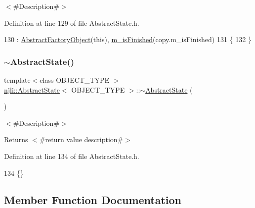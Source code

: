$<$\#\+Description\#$>$ 

Definition at line 129 of file Abstract\+State.\+h.


\begin{DoxyCode}
130       : \mbox{\hyperlink{classnjli_1_1_abstract_factory_object_a4f7ae7bf09c7c9426e7d6023f7fd8dec}{AbstractFactoryObject}}(\textcolor{keyword}{this}), \mbox{\hyperlink{classnjli_1_1_abstract_state_a445a5d1ac7572b8b01b81937c89e960c}{m\_isFinished}}(copy.m\_isFinished)
131   \{
132   \}
\end{DoxyCode}
\mbox{\label{classnjli_1_1_abstract_state_a7a85afddf6feb5908199ac3678225c5b}} 
\subsubsection{\texorpdfstring{$\sim$\+Abstract\+State()}{~AbstractState()}}
{\footnotesize\ttfamily template$<$class O\+B\+J\+E\+C\+T\+\_\+\+T\+Y\+PE $>$ \\
\mbox{\hyperlink{classnjli_1_1_abstract_state}{njli\+::\+Abstract\+State}}$<$ O\+B\+J\+E\+C\+T\+\_\+\+T\+Y\+PE $>$\+::$\sim$\mbox{\hyperlink{classnjli_1_1_abstract_state}{Abstract\+State}} (\begin{DoxyParamCaption}{ }\end{DoxyParamCaption})\hspace{0.3cm}{\ttfamily [pure virtual]}}

$<$\#\+Description\#$>$

\begin{DoxyReturn}{Returns}
$<$\#return value description\#$>$ 
\end{DoxyReturn}


Definition at line 134 of file Abstract\+State.\+h.


\begin{DoxyCode}
134 \{\}
\end{DoxyCode}


\subsection{Member Function Documentation}
\mbox{\label{classnjli_1_1_abstract_state_a83a8876ae63b92804004cf3febe76573}} 
